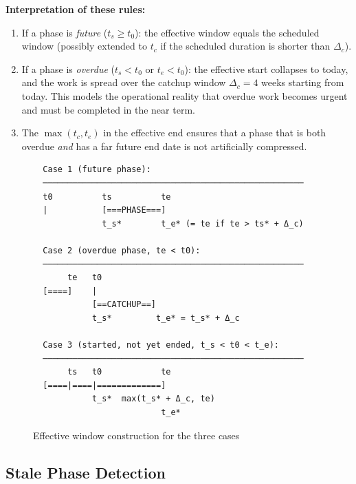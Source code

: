 \documentclass[12pt,a4paper]{report}
\begin{document}
\textbf{Interpretation of these rules:}

\begin{enumerate}
  \item If a phase is \textit{future} ($t_s \geq t_0$): the effective
        window equals the scheduled window (possibly extended to $t_c$
        if the scheduled duration is shorter than $\Delta_c$).

  \item If a phase is \textit{overdue} ($t_s < t_0$ or $t_e < t_0$):
        the effective start collapses to today, and the work is spread
        over the catchup window $\Delta_c = 4$ weeks starting from today.
        This models the operational reality that overdue work
        becomes urgent and must be completed in the near term.

  \item The $\max(t_c, t_e)$ in the effective end ensures that a phase
        that is both overdue \textit{and} has a far future end date is
        not artificially compressed.
\end{enumerate}

\begin{figure}[H]
\centering
\begin{tcolorbox}[colback=gray!8, colframe=gray!50, sharp corners]
\small
\begin{verbatim}
  Case 1 (future phase):
  ─────────────────────────────────────────────────────
  t0          ts          te
  |           [===PHASE===]
              t_s*        t_e* (= te if te > ts* + Δ_c)

  Case 2 (overdue phase, te < t0):
  ─────────────────────────────────────────────────────
       te   t0
  [====]    |
            [==CATCHUP==]
            t_s*         t_e* = t_s* + Δ_c

  Case 3 (started, not yet ended, t_s < t0 < t_e):
  ─────────────────────────────────────────────────────
       ts   t0            te
  [====|====|=============]
            t_s*  max(t_s* + Δ_c, te)
                          t_e*
\end{verbatim}
\end{tcolorbox}
\caption{Effective window construction for the three cases}
\end{figure}

\subsection{Stale Phase Detection}
\label{sec:stale}
\end{document}
